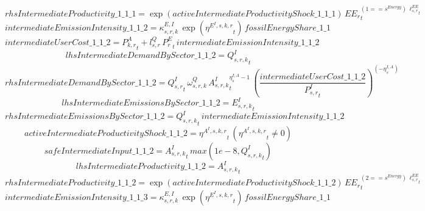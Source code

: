 \begin{dmath*}
rhsIntermediateProductivity\_1\_1\_1 = \exp\left({activeIntermediateProductivityShock\_1\_1\_1}\right)\, {{EE_r}}_{t}^{\left(1=={{s^{Energy}}}\right)\, {{\ell^{EE}_{s,r}}}_{t}}
\end{dmath*}
\begin{dmath*}
intermediateEmissionIntensity\_1\_1\_2 = {{\kappa^{E,I}_{s,r,k}}}\, \exp\left({{\eta^{E^{I},s,k,r}}}_{t}\right)\, {fossilEnergyShare\_1\_1}
\end{dmath*}
\begin{dmath*}
intermediateUserCost\_1\_1\_2 = {{P^{A}_{k,r}}}_{t}+{{l^{Q}_{s,r}}}\, {{P^E_r}}_{t}\, {intermediateEmissionIntensity\_1\_1\_2}
\end{dmath*}
\begin{dmath*}
lhsIntermediateDemandBySector\_1\_1\_2 = {{Q^{I}_{s,r,k}}}_{t}
\end{dmath*}
\begin{dmath*}
rhsIntermediateDemandBySector\_1\_1\_2 = {{Q^{I}_{s,r}}}_{t}\, {{\omega^{Q}_{s,r,k}}}\, {{A^{I}_{s,r,k}}}_{t}^{{{\eta^{I,A}_{s}}}-1}\, \left(\frac{{intermediateUserCost\_1\_1\_2}}{{{P^{I}_{s,r}}}_{t}}\right)^{\left(-{{\eta^{I,A}_{s}}}\right)}
\end{dmath*}
\begin{dmath*}
lhsIntermediateEmissionsBySector\_1\_1\_2 = {{E^I_{s,r,k}}}_{t}
\end{dmath*}
\begin{dmath*}
rhsIntermediateEmissionsBySector\_1\_1\_2 = {{Q^{I}_{s,r,k}}}_{t}\, {intermediateEmissionIntensity\_1\_1\_2}
\end{dmath*}
\begin{dmath*}
activeIntermediateProductivityShock\_1\_1\_2 = {{\eta^{A^{I},s,k,r}}}_{t}\, \left({{\eta^{A^{I},s,k,r}}}_{t}\neq 0\right)
\end{dmath*}
\begin{dmath*}
safeIntermediateInput\_1\_1\_2 = {{A^{I}_{s,r,k}}}_{t}\, max(1e-8,{{Q^{I}_{s,r,k}}}_{t})
\end{dmath*}
\begin{dmath*}
lhsIntermediateProductivity\_1\_1\_2 = {{A^{I}_{s,r,k}}}_{t}
\end{dmath*}
\begin{dmath*}
rhsIntermediateProductivity\_1\_1\_2 = \exp\left({activeIntermediateProductivityShock\_1\_1\_2}\right)\, {{EE_r}}_{t}^{\left(2=={{s^{Energy}}}\right)\, {{\ell^{EE}_{s,r}}}_{t}}
\end{dmath*}
\begin{dmath*}
intermediateEmissionIntensity\_1\_1\_3 = {{\kappa^{E,I}_{s,r,k}}}\, \exp\left({{\eta^{E^{I},s,k,r}}}_{t}\right)\, {fossilEnergyShare\_1\_1}
\end{dmath*}
